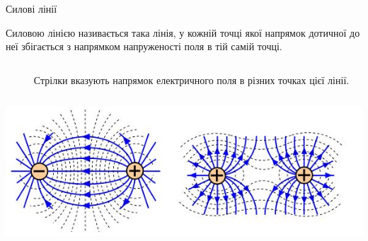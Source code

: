 \documentclass{beamer}
\begin{document}
\begin{frame}{Силові лінії}{}
	\begin{block}{}
		\alert{Силовою лінією} називається така лінія, у кожній точці якої
		напрямок дотичної до неї збігається з напрямком напруженості поля в тій
		самій точці.
	\end{block}
	\begin{columns}
		\begin{column}{0.45\linewidth}
			\begin{center}
				
			\end{center}
		\end{column}
		\begin{column}{0.45\linewidth}
			\begin{block}{}
				Стрілки вказують напрямок електричного поля в різних
				точках цієї лінії.
			\end{block}
		\end{column}
	\end{columns}
	\begin{center}
		\includegraphics[width=1\linewidth]{fieldlines}
	\end{center}
\end{frame}
\end{document}
